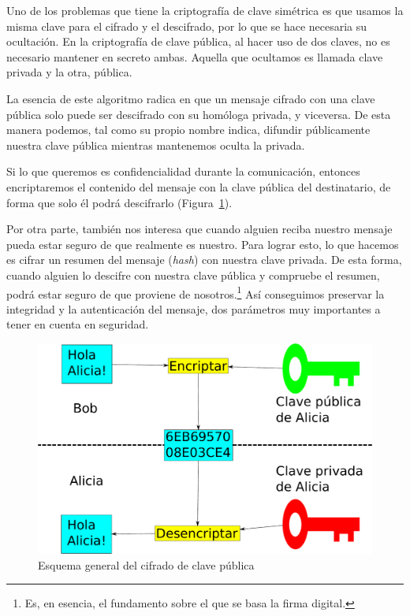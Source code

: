 Uno de los problemas que tiene la criptografía de clave simétrica es que usamos la misma clave para el cifrado y el descifrado, por lo que se hace necesaria su ocultación. En la criptografía de clave pública, al hacer uso de dos claves, no es necesario mantener en secreto ambas. Aquella que ocultamos es llamada clave privada y la otra, pública.

La esencia de este algoritmo radica en que un mensaje cifrado con una clave pública solo puede ser descifrado con su homóloga privada, y viceversa. De esta manera podemos, tal como su propio nombre indica, difundir públicamente nuestra clave pública mientras mantenemos oculta la privada.

Si lo que queremos es confidencialidad durante la comunicación, entonces encriptaremos el contenido del mensaje con la clave pública del destinatario, de forma que solo él podrá descifrarlo (Figura~\ref{fig:PublicKeyEncryption}).

Por otra parte, también nos interesa que cuando alguien reciba nuestro mensaje pueda estar seguro de que realmente es nuestro. Para lograr esto, lo que hacemos es cifrar un resumen del mensaje (\emph{hash}) con nuestra clave privada. De esta forma, cuando alguien lo descifre con nuestra clave pública y compruebe el resumen, podrá estar seguro de que proviene de nosotros.\footnote{Es, en esencia, el fundamento sobre el que se basa la firma digital.} Así conseguimos preservar la integridad y la autenticación del mensaje, dos parámetros muy importantes a tener en cuenta en seguridad. \emph{\parencite{Reference14}}

\begin{figure}[ht]
  \centering
  \includegraphics[scale=0.3]{Figures/PublicKeyEncryption}
  \decoRule
  \caption[Cifrado de clave pública (Esquema)]{Esquema general del cifrado de clave pública}
  \label{fig:PublicKeyEncryption}
\end{figure}


